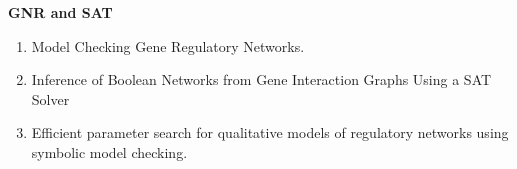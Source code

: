 \textbf{GNR and SAT}
\begin{enumerate}
\item Model Checking Gene Regulatory Networks.
\item Inference of Boolean Networks from Gene Interaction Graphs Using a SAT Solver
\item Efficient parameter search for qualitative models of regulatory networks using symbolic model checking.
\end{enumerate}


